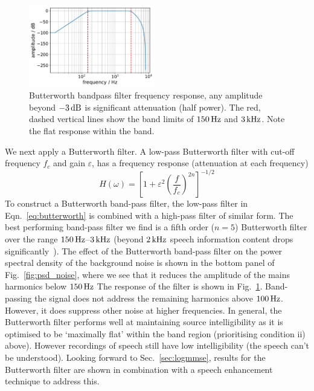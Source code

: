 \documentclass[paper-main.tex]{subfiles}
\begin{document}


\begin{figure}
	\includegraphics[width=0.49\textwidth]{figures/butterworth_150_3000.pdf}
	\caption{Butterworth bandpass filter frequency response, any amplitude beyond $-3\,{\rm dB}$ is significant attenuation (half power). The red, dashed vertical lines show the band limits of $150\,{\rm Hz}$ and $3\,{\rm kHz}$. Note the flat response within the band.}
	\label{fig:butterworth}
\end{figure}

We next apply a Butterworth filter. 
A low-pass Butterworth filter with cut-off frequency $f_c$ and gain $\varepsilon$, has a frequency response (attenuation at each frequency)
\begin{equation}
\label{eq:butterworth}
H(\omega) = \left[1+\varepsilon^2 \left( \frac{f}{f_c} \right)^{2n}\right]^{-1/2}
\end{equation}
To construct a Butterworth band-pass filter, the low-pass filter in Eqn.~\ref{eq:butterworth} is combined with a high-pass filter of similar form. 
The best performing band-pass filter we find is a fifth order ($n = 5$) Butterworth filter over the range $150\,{\rm Hz}$--$3\,{\rm kHz}$ (beyond $2\,{\rm kHz}$ speech information content drops significantly~\cite{speech_intelligibility}). 
The effect of the Butterworth band-pass filter on the power spectral density of the background noise is shown in the bottom panel of Fig.~\ref{fig:psd_noise}, where we see that it reduces the amplitude of the mains harmonics below $150\,{\rm Hz}$ 
The response of the filter is shown in Fig.~\ref{fig:butterworth}.
Band-passing the signal does not address the remaining harmonics above $100\,{\rm Hz}$. 
However, it does suppress other noise at higher frequencies. 
In general, the Butterworth filter performs well at maintaining source intelligibility as it is optimised to be `maximally flat' within the band region (prioritising condition ii) above).
However recordings of speech still have low intelligibility (the speech can't be understood).
Looking forward to Sec.~\ref{sec:logmmse}, results for the Butterworth filter are shown in combination with a speech enhancement technique to address this. 
\end{document}
